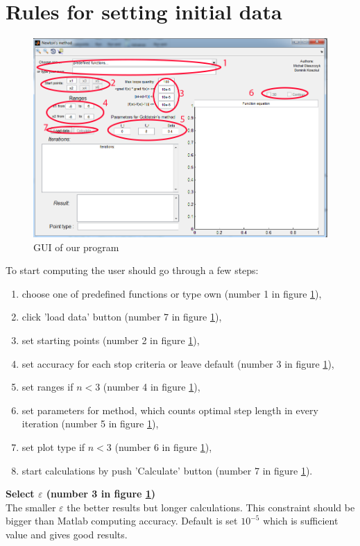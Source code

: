 \documentclass[12pt]{article}
\begin{document}
\section{Rules for setting initial data}
\begin{figure}[H]
\begin{center}
\includegraphics[scale=0.3]{images/program.png}
\caption{GUI of our program}
\label{program}
\end{center}		
\end{figure}
To start computing the user should go through a few steps:
\begin{enumerate}
\item choose one of predefined functions or type own (number 1 in figure \ref{program}),
\item click 'load data' button (number 7 in figure \ref{program}),
\item set starting points (number 2 in figure \ref{program}),
\item set accuracy for each stop criteria or leave default (number 3 in figure \ref{program}),
\item set ranges if $n < 3$ (number 4 in figure \ref{program}),
\item set parameters for method, which counts optimal step length in every iteration (number 5 in figure \ref{program}),
\item set plot type if $n < 3$ (number 6 in figure \ref{program}),
\item start calculations by push 'Calculate' button (number 7 in figure \ref{program}).
\end{enumerate}
\textbf{Select $\varepsilon$ (number 3 in figure \ref{program})} \\
The smaller $\varepsilon$ the better results but longer calculations. This constraint should be bigger than Matlab computing accuracy. Default is set $10^{-5}$ which is sufficient value and gives good results. \\
\end{document}
